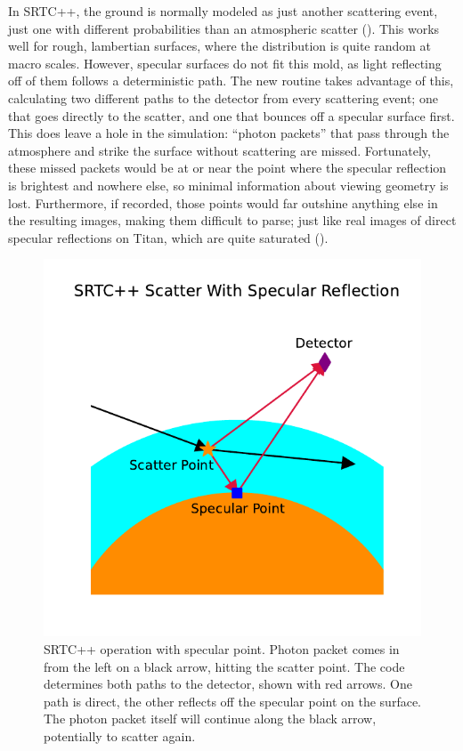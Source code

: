 \documentclass{article}
\begin{document}
In SRTC++, the ground is normally modeled as just another scattering event, just one with different probabilities than an atmospheric scatter (\cite{Barnes2018}). This works well for rough, lambertian surfaces, where the distribution is quite random at macro scales. However, specular surfaces do not fit this mold, as light reflecting off of them follows a deterministic path.  The new routine takes advantage of this, calculating two different paths to the detector from every scattering event; one that goes directly to the scatter, and one that bounces off a specular surface first. This does leave a hole in the simulation: ``photon packets'' that pass through the atmosphere and strike the surface without scattering are missed. Fortunately, these missed packets would be at or near the point where the specular reflection is brightest and nowhere else, so minimal information about viewing geometry is lost. Furthermore, if recorded, those points would far outshine anything else in the resulting images, making them difficult to parse; just like real images of direct specular reflections on Titan, which are quite saturated (\cite{Barnes2013}).

\begin{figure}[htb]
\includegraphics[scale = 0.55]{SRTCSpec.pdf}
\centering
\caption{SRTC++ operation with specular point. Photon packet comes in from the left on a black arrow, hitting the scatter point. The code determines both paths to the detector, shown with red arrows. One path is direct, the other reflects off the specular point on the surface. The photon packet itself will continue along the black arrow, potentially to scatter again.}
\label{fig:2}
\end{figure}
\end{document}
